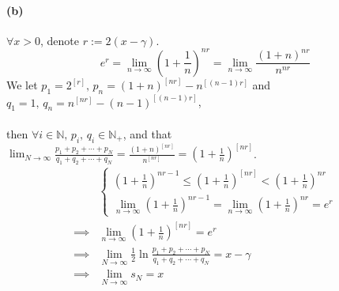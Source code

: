 \documentclass{article}
\def\to{\rightarrow}
\begin{document}
\paragraph{(b)}
$\forall x>0$, denote $r:=2(x-\gamma)$.
$$e^r = \lim_{n\to\infty} \left( 1 + \frac{1}{n} \right) ^ {nr} = \lim_{n\to\infty} \frac{(1+n)^{nr}}{n^{nr}}$$
We let $p_1 = 2^{[r]} ,\, p_n = (1+n)^{[nr]} - n^{[(n-1)r]}$ and $q_1 = 1 ,\, q_n = n^{[nr]} - (n-1)^{[(n-1)r]}$,
\\\\
then $\forall i \in \mathbb{N} ,\, p_i ,\, q_i \in \mathbb{N_+}$, and that $\lim_{N\to\infty} \frac{p_1 + p_2 + \cdots + p_N}{q_1 + q_2 + \cdots + q_N} = \frac{(1+n)^{[nr]}}{n^{[nr]}} = \left( 1 + \frac{1}{n} \right) ^ {[nr]}$.
$$\begin{aligned}
    &\left\{ \begin{array}{l}    \left( 1 + \frac{1}{n} \right) ^ {nr-1} \le \left( 1 + \frac{1}{n} \right) ^ {[nr]} < \left( 1 + \frac{1}{n} \right) ^ {nr} \\
                                \lim_{n\to\infty} \left( 1 + \frac{1}{n} \right) ^ {nr-1} = \lim_{n\to\infty} \left( 1 + \frac{1}{n} \right) ^ {nr} = e^r \end{array} \right. \\
    \implies & \lim_{n\to\infty} \left( 1 + \frac{1}{n} \right) ^ {[nr]} = e^r \\
    \implies & \lim_{N\to\infty} \frac{1}{2} \ln \frac{p_1 + p_2 + \cdots + p_N}{q_1 + q_2 + \cdots + q_N} = x - \gamma\\
    \implies & \lim_{N\to\infty} s_N = x
\end{aligned}$$
\end{document}

